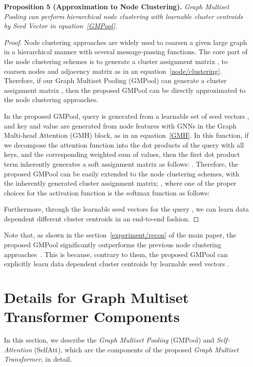 \textbf{Proposition 5 (Approximation to Node Clustering).} \emph{Graph Multiset Pooling  can perform hierarchical node clustering with learnable  cluster centroids by Seed Vector  in equation~\ref{GMPool}.}

\begin{proof}
Node clustering approaches are widely used to coarsen a given large graph in a hierarchical manner with several message-passing functions. The core part of the node clustering schemes is to generate a cluster assignment matrix , to coarsen nodes and adjacency matrix as in an equation~\ref{node/clustering}. Therefore, if our Graph Multiset Pooling (GMPool) can generate a cluster assignment matrix , then the proposed GMPool can be directly approximated to the node clustering approaches.

In the proposed GMPool, query  is generated from a learnable set of  seed vectors , and key  and value  are generated from node features  with GNNs in the Graph Multi-head Attention (GMH) block, as in an equation~\ref{GMH}. In this function, if we decompose the attention function  into the dot products of the query with all keys, and the corresponding weighted sum of values, then the first dot product term inherently generates a soft assignment matrix as follows: . Therefore, the proposed GMPool can be easily extended to the node clustering schemes, with the inherently generated cluster assignment matrix; , where one of the proper choices for the activation function  is the softmax function as follows: 


Furthermore, through the learnable seed vectors  for the query , we can learn data dependent  different cluster centroids in an end-to-end fashion.
\end{proof}

Note that, as shown in the section~\ref{experiment/recon} of the main paper, the proposed GMPool significantly outperforms the previous node clustering approaches~\citep{DiffPool, MincutPool}. This is because, contrary to them, the proposed GMPool can explicitly learn data dependent  cluster centroids by learnable seed vectors .

\section{Details for Graph Multiset Transformer Components \label{appendix/model/detail}}
In this section, we describe the \emph{Graph Multiset Pooling} (GMPool) and \emph{Self-Attention} (SelfAtt), which are the components of the proposed \emph{Graph Multiset Transformer}, in detail.

